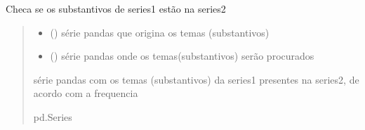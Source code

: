 \documentclass[letterpaper,10pt,english]{sphinxmanual}
\begin{document}
\begin{fulllineitems}
\label{\detokenize{index:functions.theme}}
\pysigstartsignatures
{}
\pysigstopsignatures
\sphinxAtStartPar
Checa se os substantivos de series1 estão na series2
\begin{quote}\begin{description}
\begin{itemize}
\item {} 
\sphinxAtStartPar
{} () \textendash{} série pandas que origina os temas (substantivos)

\item {} 
\sphinxAtStartPar
{} () \textendash{} série pandas onde os temas(substantivos) serão procurados

\end{itemize}

\sphinxAtStartPar
série pandas com os temas (substantivos) da series1 presentes na series2, de acordo com a frequencia

\sphinxAtStartPar
pd.Series

\end{description}\end{quote}

\end{fulllineitems}

\end{document}
